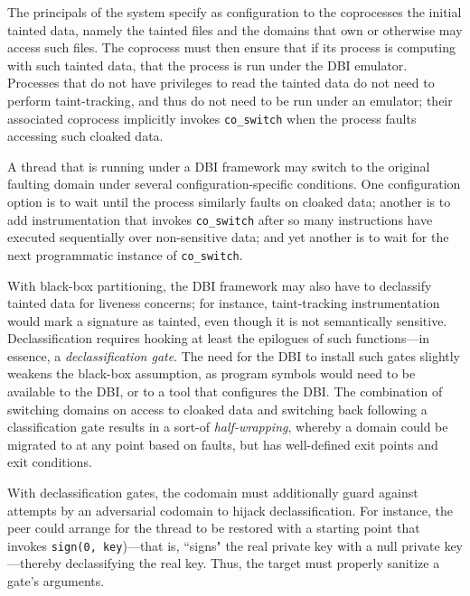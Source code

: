 %
The principals of the system specify as configuration to the coprocesses the
initial tainted data, namely the tainted files and the domains that own or
otherwise may access such files.
%
The coprocess must then ensure that if its process is computing with such
tainted data, that the process is run under the DBI emulator.
%
Processes that do not have privileges to read the tainted data do not need to
perform taint-tracking, and thus do not need to be run under an emulator; their
associated coprocess implicitly invokes \texttt{co\_switch} when the process
faults accessing such cloaked data.


A thread that is running under a DBI framework may switch to the
original faulting domain under several configuration-specific conditions.
%
One configuration option is to wait until the process similarly faults on
cloaked data; another is to add instrumentation that invokes
\texttt{co\_switch} after so many instructions have executed sequentially over
non-sensitive data; and yet another is to wait for the next programmatic
instance of \texttt{co\_switch}.


%
With black-box partitioning, the DBI framework may also have to declassify tainted
data for liveness concerns; for instance, taint-tracking instrumentation would
mark a signature as tainted, even though it is not semantically sensitive.
%
Declassification requires hooking at least the epilogues of such functions---in
essence, a \emph{declassification gate}.
%
The need for the DBI to install such gates slightly weakens the black-box
assumption, as program symbols would need to be available to
the DBI, or to a tool that configures the DBI\@.
%
The combination of switching domains on access to cloaked data and switching
back following a classification gate results in a sort-of \emph{half-wrapping},
whereby a domain could be migrated to at any point based on faults, but has
well-defined exit points and exit conditions.


With declassification gates, the codomain  must additionally guard against
attempts by an adversarial codomain to hijack declassification.
%
For instance, the peer could arrange for the thread to be restored with a
starting point that invokes \texttt{sign(0, key})---that is, ``signs" the real
private key with a null private key---thereby declassifying the real key.
%
Thus, the target must properly sanitize a gate's arguments.





